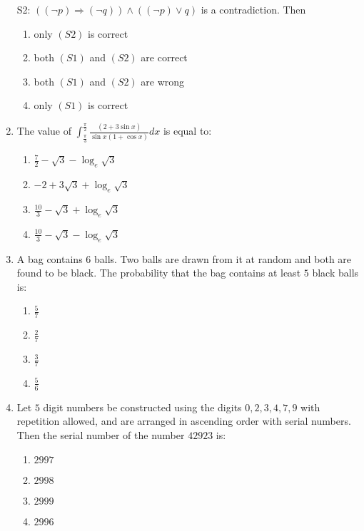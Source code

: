 \documentclass[journal]{IEEEtran}
\newcommand{\brak}[1]{\left( #1 \right)}
\begin{document}
\begin{enumerate}
      S2: $\brak{\brak{\neg p}\Rightarrow\brak{\neg q}}\land\brak{\brak{\neg p}\lor q}$ is a contradiction. Then
    
        \begin{enumerate}
        \item only $\brak{S2}$ is correct
        \item both $\brak{S1}$ and $\brak{S2}$ are correct
        \item both $\brak{S1}$ and $\brak{S2}$ are wrong
        \item only $\brak{S1}$ is correct
        \end{enumerate}
    
    \item The value of $\int_{\frac{\pi}{3}}^{\frac{\pi}{2}}\frac{\brak{2+3\sin{x}}}{\sin{x}\brak{1+\cos{x}}}dx$ is equal to:

        \begin{enumerate}
        \item $\frac{7}{2}-\sqrt{3}-\log_{e}\sqrt{3}$
        \item $-2+3\sqrt{3}+\log_{e}\sqrt{3}$
        \item $\frac{10}{3}-\sqrt{3}+\log_{e}\sqrt{3}$
        \item $\frac{10}{3}-\sqrt{3}-\log_{e}\sqrt{3}$
        \end{enumerate}

    \item A bag contains $6$ balls. Two balls are drawn from it at random and both are found to be black. The probability that the bag contains at least $5$ black balls is:

        \begin{multicols}{4}
        \begin{enumerate}
        \item $\frac{5}{7}$
        \item $\frac{2}{7}$
        \item $\frac{3}{7}$
        \item $\frac{5}{6}$
        \end{enumerate}
        \end{multicols}

    \item Let $5$ digit numbers be constructed using the digits $0, 2, 3, 4, 7, 9$ with repetition allowed, and are arranged in ascending order with serial numbers. Then the serial number of the number $42923$ is:

        \begin{multicols}{4}
        \begin{enumerate}
        \item $2997$
        \item $2998$
        \item $2999$
        \item $2996$
        \end{enumerate}
        \end{multicols}


\end{enumerate}
\end{document}
